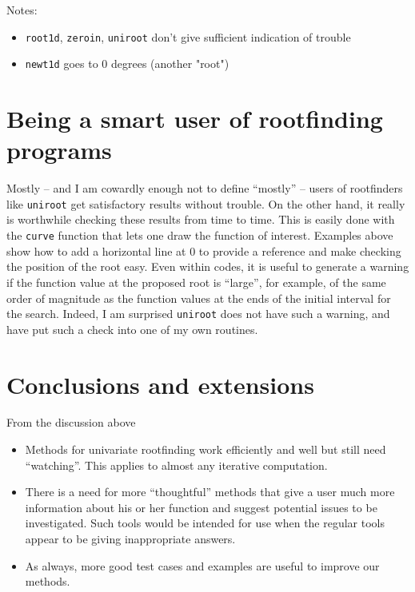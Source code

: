 \documentclass[11pt,letterpaper]{article}
\begin{document}
Notes: 
\begin{itemize}
\item \texttt{root1d}, \texttt{zeroin}, \texttt{uniroot} don't give sufficient 
indication of trouble
\item \texttt{newt1d} goes to 0 degrees (another "root")
\end{itemize}

\section{Being a smart user of rootfinding programs}

Mostly -- and I am cowardly enough not to define ``mostly'' -- users of 
rootfinders like \texttt{uniroot} get satisfactory results without trouble. On the
other hand, it really is worthwhile checking these results from time to time. This
is easily done with the \texttt{curve} function that lets one draw the function of
interest. Examples above show how to add a horizontal line at 0 to provide a reference
and make checking the position of the root easy. Even within codes, it is useful to
generate a warning if the function value at the proposed root is ``large'', for
example, of the same order of magnitude as the function values at the ends of the
initial interval for the search. Indeed, I am surprised \texttt{uniroot} does not
have such a warning, and have put such a check into one of my own routines.

\section{Conclusions and extensions}

From the discussion above

\begin{itemize}
\item{Methods for univariate rootfinding work efficiently and well but still need
``watching''. This applies to almost any iterative computation.}
\item{There is a need for more ``thoughtful'' methods that give a user much more 
information about his or her function and suggest potential issues to be investigated. 
Such tools would be intended for use when the regular tools appear to be giving 
inappropriate answers.}
\item{As always, more good test cases and examples are useful to improve our methods.}
\end{itemize}



\end{document}
